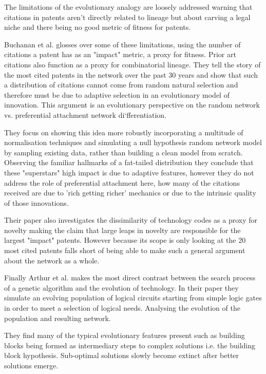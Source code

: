\documentclass[12pt,journal,compsoc]{IEEEtran}
\begin{document}
The limitations of the evolutionary analogy are loosely addressed warning that citations in patents aren't directly related to lineage but about carving a legal niche and there being no good metric of fitness for patents. 

Buchanan et al. \cite{buchanan2011measuring} glosses over some of these limitations, using the number of citations a patent has as an "impact" metric, a proxy for fitness. Prior art citations also function as a proxy for combinatorial lineage. They tell the story of the most cited patents in the network over the past 30 years and show that such a distribution of citations cannot come from random natural selection and therefore must be due to adaptive selection in an evolutionary model of innovation. This argument is an evolutionary perspective on the random network vs. preferential attachment network di`fferentiation. 

They focus on showing this idea more robustly incorporating a multitude of normalisation techniques and simulating a null hypothesis random network model by sampling existing data, rather than building a clean model from scratch. Observing the familiar hallmarks of a fat-tailed distribution they conclude that these "superstars" high impact is due to adaptive features, however they do not address the role of preferential attachment here, how many of the citations received are due to 'rich getting richer' mechanics or due to the intrinsic quality of those innovations. 

Their paper also investigates the dissimilarity of technology codes as a proxy for novelty making the claim that large leaps in novelty are responsible for the largest "impact" patents. However because its scope is only looking at the 20 most cited patents falls short of being able to make such a general argument about the network as a whole. 

Finally Arthur et al. \cite{arthur2014evolution} makes the most direct contrast between the search process of a genetic algorithm and the evolution of technology. In their paper they simulate an evolving population of logical circuits starting from simple logic gates in order to meet a selection of logical needs. Analysing the evolution of the population and resulting network. 

They find many of the typical evolutionary features present such as building blocks being formed as intermediary steps to complex solutions i.e. the building block hypothesis. Sub-optimal solutions slowly become extinct after better solutions emerge.
\end{document}
